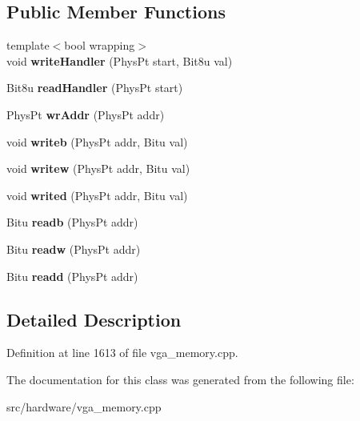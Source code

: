 \subsection*{Public Member Functions}
\begin{DoxyCompactItemize}
\item 
\hypertarget{classVGA__AMS__Handler_aeb0a1c400b9162e4e5e48bf0905d4865}{{\footnotesize template$<$bool wrapping$>$ }\\void {\bfseries write\-Handler} (Phys\-Pt start, Bit8u val)}\label{classVGA__AMS__Handler_aeb0a1c400b9162e4e5e48bf0905d4865}

\item 
\hypertarget{classVGA__AMS__Handler_a5661278164e2d7259ee9c8fe4c35d6df}{Bit8u {\bfseries read\-Handler} (Phys\-Pt start)}\label{classVGA__AMS__Handler_a5661278164e2d7259ee9c8fe4c35d6df}

\item 
\hypertarget{classVGA__AMS__Handler_a63b72ffd104220eb928c683bae72def3}{Phys\-Pt {\bfseries wr\-Addr} (Phys\-Pt addr)}\label{classVGA__AMS__Handler_a63b72ffd104220eb928c683bae72def3}

\item 
\hypertarget{classVGA__AMS__Handler_a59765d00055305e3d5d9cae3eda1a135}{void {\bfseries writeb} (Phys\-Pt addr, Bitu val)}\label{classVGA__AMS__Handler_a59765d00055305e3d5d9cae3eda1a135}

\item 
\hypertarget{classVGA__AMS__Handler_a2ca35cd2132c57ab9a6cd145ca686efd}{void {\bfseries writew} (Phys\-Pt addr, Bitu val)}\label{classVGA__AMS__Handler_a2ca35cd2132c57ab9a6cd145ca686efd}

\item 
\hypertarget{classVGA__AMS__Handler_a3a628a09de5d72345c7b602f162de07b}{void {\bfseries writed} (Phys\-Pt addr, Bitu val)}\label{classVGA__AMS__Handler_a3a628a09de5d72345c7b602f162de07b}

\item 
\hypertarget{classVGA__AMS__Handler_aa0a91b3133a6f53ab71af097705e5576}{Bitu {\bfseries readb} (Phys\-Pt addr)}\label{classVGA__AMS__Handler_aa0a91b3133a6f53ab71af097705e5576}

\item 
\hypertarget{classVGA__AMS__Handler_a91ae2471698b76066cff1f58dac6708c}{Bitu {\bfseries readw} (Phys\-Pt addr)}\label{classVGA__AMS__Handler_a91ae2471698b76066cff1f58dac6708c}

\item 
\hypertarget{classVGA__AMS__Handler_a98c3e7090b6a26e69c4afc84dc092415}{Bitu {\bfseries readd} (Phys\-Pt addr)}\label{classVGA__AMS__Handler_a98c3e7090b6a26e69c4afc84dc092415}

\end{DoxyCompactItemize}


\subsection{Detailed Description}


Definition at line 1613 of file vga\-\_\-memory.\-cpp.



The documentation for this class was generated from the following file\-:\begin{DoxyCompactItemize}
\item 
src/hardware/vga\-\_\-memory.\-cpp\end{DoxyCompactItemize}

